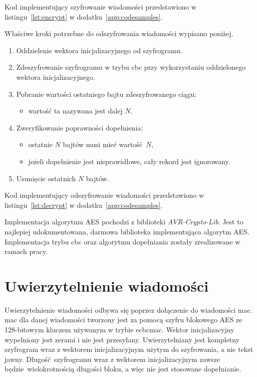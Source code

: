 Kod implementujący szyfrowanie wiadomości przedstawiono w listingu~\ref{lst:encrypt} w dodatku~\ref{app:codesamples}.

Właściwe kroki potrzebne do odszyfrowania wiadomości wypisano poniżej.

\begin{enumerate}
\item Oddzielenie wektora inicjalizacyjnego od szyfrogramu.
\item Zdeszyfrowanie szyfrogramu w trybu \gls{cbc} przy wykorzystaniu oddzielonego wektora inicjalizacyjnego.
\item Pobranie wartości ostatniego bajtu zdeszyfrowanego ciągu:
\begin{itemize}
    \item wartość ta nazywana jest dalej $ N $.
\end{itemize}
\item Zweryfikowanie poprawności dopełnienia:
\begin{itemize}
    \item ostatnie $ N $ bajtów musi mieć wartość $ N $,
    \item jeżeli dopełnienie jest nieprawidłowe, cały rekord jest ignorowany.
\end{itemize}
\item Usunięcie ostatnich $ N $ bajtów.
\end{enumerate}

Kod implementujący odszyfrowanie wiadomości przedstawiono w listingu~\ref{lst:decrypt} w dodatku~\ref{app:codesamples}.

Implementacja algorytmu AES pochodzi z biblioteki \emph{AVR-Crypto-Lib}. Jest to najlepiej udokumentowana, darmowa biblioteka implementująca algorytm AES. Implementacja trybu \gls{cbc} oraz algorytmu dopełniania zostały zrealizowane w ramach pracy.

\section{Uwierzytelnienie wiadomości}
\label{sec:auth}

Uwierzytelnienie wiadomości odbywa się poprzez dołączenie do wiadomości \gls{mac}. \gls{mac} dla danej wiadomości tworzony jest za pomocą szyfru blokowego AES ze 128-bitowym kluczem używanym w trybie \gls{ecbcmac}. Wektor inicjalizacyjny wypełniony jest zerami i nie jest przesyłany. Uwierzytelniany jest kompletny szyfrogram wraz z wektorem inicjalizacyjnym użytym do szyfrowania, a nie tekst jawny. Długość szyfrogramu wraz z wektorem inicjalizacyjnym zawsze będzie wielokrotnością długości bloku, a więc nie jest stosowane dopełnianie.

